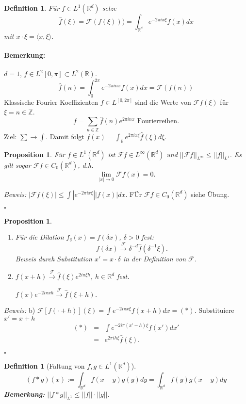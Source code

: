\documentclass[11pt,a4paper,titlepage, ngerman]{scrartcl}
\newtheorem{Definition}[Satz]{Definition}
\newtheorem{Prop}[Satz]{Proposition}
\numberwithin{equation}{section}
\newcommand{\R}{\mathbb{R}} %
\newcommand{\Z}{\mathbb{Z}} %
\newcommand{\f}{\hat{f}}
\newcommand{\F}{\mathcal{F}}
\newcommand{\m}{\cdot}
\newcommand{\Bew}{\emph{Beweis: }}
\newcommand{\qed}{\begin{flushright}
		$\square$
	\end{flushright}}
\begin{document}
	\begin{Definition}
		Für $f\in L^1(\R^d)$ setze 
		$$\f(\xi) = \F(f(\xi))) = \int_{\R^d} e^{-2\pi ix\xi}f(x)dx$$
		mit $x\m \xi = \langle x,\xi\rangle$.
	\end{Definition}
	
	\paragraph{Bemerkung:} $d = 1$, $f\in L^2[0,\pi]\subset L^2(\R)$.
	$$\f(n) = \int_{0}^{2\pi} e^{-2\pi i n x}f(x) dx = \F(f(n))$$
	Klassische Fourier Koeffizienten $f\in L^[0,2\pi]$ sind die Werte von $\F f(\xi)$ für $\xi = n\in \Z$.
	$$f= \sum_{n \in \Z} \f(n) e^{2\pi i n x} \text{ Fourierreihen.}$$
	Ziel: $\sum\rightarrow \int$. Damit folgt $f(x) = \int_{\R}e^{2\pi i x \xi}\f(\xi)d\xi$.
	
	\begin{Prop}
		Für $f\in L^1(\R^d)$ ist $\F f\in L^{\infty}(\R^d)$ und $||\F f||_{L^\infty}\leq ||f||_{L^1}$. Es gilt sogar $\F f\in C_0(\R^d)$, d.h. 
		$$\lim\limits_{|x|\rightarrow 0}\F f(x) = 0.$$
	\end{Prop}
	
	\Bew $|\F f(\xi)|\leq \int |e^{-2\pi i x\xi}| |f(x)| dx$. FÜr $\F f\in C_0(\R^d)$ siehe Übung.
	\qed
	
	\begin{Prop}
		~
		\begin{enumerate}
			\item[a)] Für die Dilation $f_\delta(x) = f(\delta x)$, $\delta>0$ fest:
			$$f(\delta x) \overset{\F}{\rightarrow} \delta^{-d}\f(\delta^{-1}\xi).$$
			Beweis durch Substitution $x' = x\m \delta$ in der Definition von $\F$.
			\item[b)] $f(x+h) \overset{\F}{\rightarrow} \f(\xi)e^{2i\pi \xi h}$, $h\in \R^d$ fest. 
			
			$f(x)e^{-2i\pi x h}\overset{\F}{\rightarrow} \f(\xi+h)$. 
		\end{enumerate}
	\end{Prop}
	\Bew b) $\F[f(\m+h)](\xi) = \int e^{-2i\pi x\xi}f(x+h) dx = (*)$. Substituiere $x' = x+h$
	\begin{eqnarray}
		(*) &=& \int e^{-2i\pi (x'-h)\xi}f(x')dx'\nonumber\\
		&=& e^{2\pi i h\xi}\f(\xi).\nonumber
	\end{eqnarray}
	\qed
	
	\begin{Definition}[Faltung von $f,g\in L^1(\R^d)$]
		$$(f*g)(x):= \int_{\R^d}f(x-y)g(y)dy = \int_{\R^d}f(y) g(x-y) dy$$
		\textbf{Bemerkung:} $||f*g||_{L^1}\leq ||f||\m ||g||$.
	\end{Definition}
	
\end{document}
